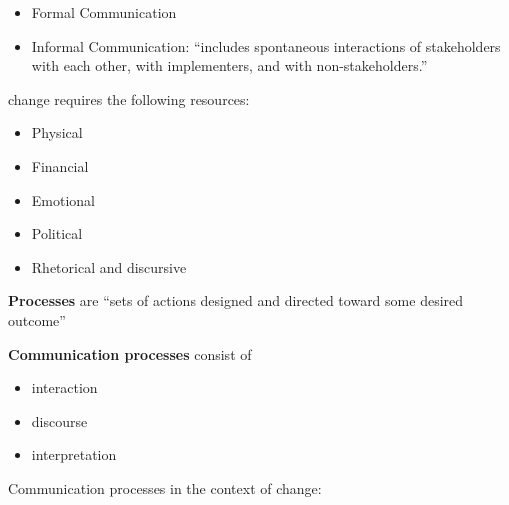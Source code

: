 \documentclass[
]{book}
\providecommand{\tightlist}{%
  \setlength{\itemsep}{0pt}\setlength{\parskip}{0pt}}
\begin{document}
\begin{itemize}
\tightlist
\item
  Formal Communication
\item
  Informal Communication: ``includes spontaneous interactions of stakeholders with each other, with implementers, and
  with non-stakeholders.''
\end{itemize}

change requires the following resources:

\begin{itemize}
\tightlist
\item
  Physical
\item
  Financial
\item
  Emotional
\item
  Political
\item
  Rhetorical and discursive
\end{itemize}

\textbf{Processes} are ``sets of actions designed and directed toward some desired outcome''

\textbf{Communication processes} consist of

\begin{itemize}
\tightlist
\item
  interaction
\item
  discourse
\item
  interpretation
\end{itemize}

Communication processes in the context of change:
\end{document}
